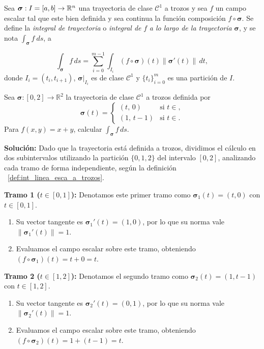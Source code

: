  
\begin{definition}\label{def:int_linea_esca_a_trozos}  Sea $\boldsymbol{\sigma}:I=[a,b]\to\mathbb{R}^n$ una trayectoria de clase $\mathcal{C}^1$ a trozos   y  sea $f$ un campo escalar tal que este bien definida y sea continua   la funci\'on composici\'on $f\circ\boldsymbol{\sigma}$.  Se define la \emph{integral de trayectoria}  o \emph{integral de} $f$ \emph{a lo largo de la trayectoria} $\boldsymbol{\sigma}$, y se  nota $\int_{\boldsymbol{\sigma}}f\:ds$, a
  
    \[
       \int_{\boldsymbol{\sigma}}f \, ds =\sum_{i=0}^{m-1}\int_{I_i}  (f\circ\boldsymbol{\sigma})(t)\|\boldsymbol{\sigma}'(t)\| \, dt,  
    \]
    donde $ I_i= (t_i, t_{i+1})$,  $\boldsymbol{\sigma}\lvert_{I_i}$ es de clase $\mathcal{C}^1$  y  $\{t_i\}_{i=0}^{m}$  es una partici\'on de $I$.
\end{definition}

\begin{example} 

Sea $\boldsymbol{\sigma} : [0, 2] \to \mathbb{R}^2$ la trayectoria de clase $\mathcal{C}^1$ a trozos definida por 
\[ 
\boldsymbol{\sigma}(t) = \begin{cases} (t,\, 0) & \text{si } t \in, \\ (1,\, t - 1) & \text{si } t \in. \end{cases} 
\] 
Para  $f(x, y) = x + y$,   calcular $\displaystyle\int_{\boldsymbol{\sigma}} f\, ds$.
\end{example}


\noindent\textbf{Solución:} Dado que la trayectoria está definida a trozos, dividimos el cálculo en dos subintervalos utilizando la partición $\{0, 1, 2\}$ del intervalo $[0,2]$,  analizando cada tramo de forma independiente, seg\'un la  definición ~\ref{def:int_linea_esca_a_trozos}.

\noindent\textbf{Tramo 1 ($t \in [0, 1]$):} Denotamos este primer tramo como $\boldsymbol{\sigma}_1(t) = (t, 0)$ con $t \in [0,1]$. 
\begin{enumerate}
    \item Su vector tangente es $\boldsymbol{\sigma}_1'(t) = (1, 0)$,  por lo que su norma vale $\|\boldsymbol{\sigma}_1'(t)\| = 1$.
    \item Evaluamos el campo escalar sobre este tramo, obteniendo $ (f \circ \boldsymbol{\sigma}_1) (t)  = t + 0 = t$.
\end{enumerate}

\noindent\textbf{Tramo 2 ($t \in [1, 2]$):} Denotamos el segundo tramo como $\boldsymbol{\sigma}_2(t) = (1, t - 1)$  con $t \in [1,2]$. 
\begin{enumerate}
    \item Su vector tangente es $\boldsymbol{\sigma}_2'(t) = (0, 1)$, por lo que su norma vale $\|\boldsymbol{\sigma}_2'(t)\| = 1$.
    \item Evaluamos el campo escalar sobre este tramo, obteniendo $ (f \circ \boldsymbol{\sigma}_2) (t) = 1 + (t - 1) = t$.
\end{enumerate}


